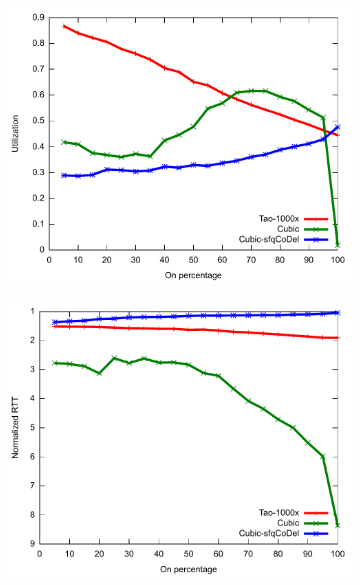 \begin{figure}
\centering
\begin{subfigure}[b]{0.33\textwidth}
\includegraphics[width=\textwidth]{figures/workload-agility-tpt.pdf}
\end{subfigure}
\begin{subfigure}[b]{0.33\textwidth}
\includegraphics[width=\textwidth]{figures/workload-agility-delay.pdf}
\end{subfigure}
\begin{subfigure}[b]{0.33\textwidth}

\end{subfigure}
\end{figure}
